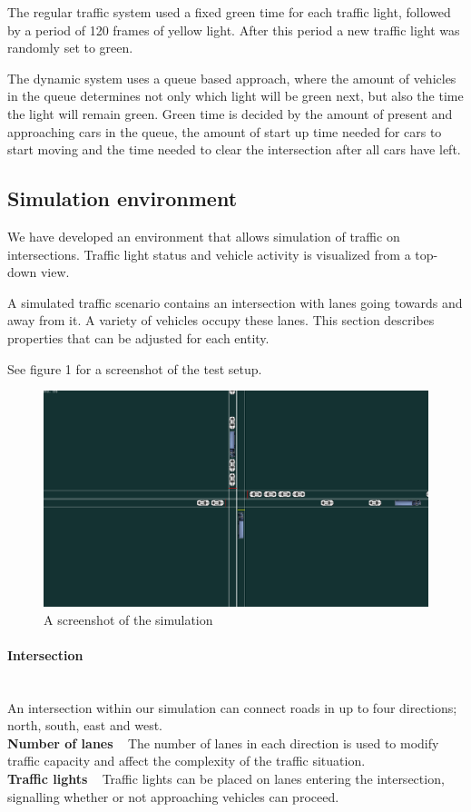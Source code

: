 \documentclass{article}
\begin{document}
The regular traffic system used a fixed green time for each traffic light, followed by a period of 120 frames of yellow light. After this period a new traffic light was randomly set to green.

The dynamic system uses a queue based approach, where the amount of vehicles in the queue determines not only which light will be green next, but also the time the light will remain green. Green time is decided by the amount of present and approaching cars in the queue, the amount of start up time needed for cars to start moving and the time needed to clear the intersection after all cars have left. 



\subsection{Simulation environment}
We have developed an environment that allows simulation of traffic on intersections. Traffic light status and vehicle activity is visualized from a top-down view.

A simulated traffic scenario contains an intersection with lanes going towards and away from it. A variety of vehicles occupy these lanes. This section describes properties that can be adjusted for each entity.

See figure 1 for a screenshot of the test setup.

\begin{figure}[h!]
\includegraphics[width=12cm]{sim_screenshot.png}
\caption{A screenshot of the simulation}
\end{figure}

\paragraph{Intersection} ~\\
An intersection within our simulation can connect roads in up to four directions; north, south, east and west. \\
\textbf{Number of lanes} ~ The number of lanes in each direction is used to modify traffic capacity and affect the complexity of the traffic situation.\\
\textbf{Traffic lights} ~ Traffic lights can be placed on lanes entering the intersection, signalling whether or not approaching vehicles can proceed.
\end{document}
